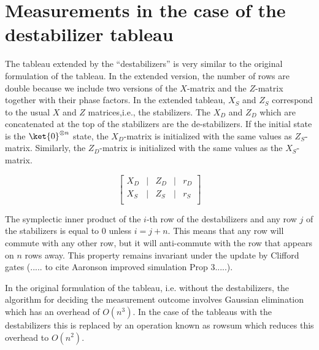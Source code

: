 \section{Measurements in the case of the destabilizer tableau}	


The tableau extended by the ``destabilizers'' is very similar to the original formulation of the tableau. In the extended version, the number of rows are double because we include two versions of the $X$-matrix and the $Z$-matrix together with their phase factors. In the extended tableau, $X_S$ and $Z_S$ correspond to the usual $X$ and $Z$ matrices,i.e., the stabilizers. The $X_D$ and $Z_D$ which are concatenated at the top of the stabilizers are the de-stabilizers. If the initial state is the $\ket{0}^{\otimes n}$ state, the $X_D$-matrix is initialized with the same values as $Z_S$-matrix. Similarly, the $Z_D$-matrix is initialized with the same values as the $X_S$-matrix.

\begin{equation} 
	\begin{bmatrix}
		X_D & \vert & Z_D & \vert & r_D \\
		\hline
		X_S & \vert & Z_S & \vert & r_S \\
	\end{bmatrix}
\end{equation}

The symplectic inner product of the $i$-th row of the destabilizers and any row $j$ of the stabilizers is equal to 0 unless $i=j+n$. This means that any row will commute with any other row, but it will anti-commute with the row that appears on $n$ rows away. This property remains invariant under the update by Clifford gates (..... to cite Aaronson improved simulation Prop 3.....).


In the original formulation of the tableau, i.e. without the destabilizers, the algorithm for deciding the measurement outcome involves Gaussian elimination which has an overhead of $O(n^3)$. In the case of the tableaus with the destabilizers this is replaced by an operation known as rowsum which reduces this overhead to $O(n^2)$.   

